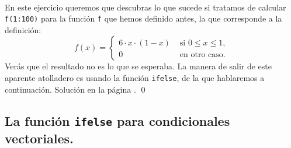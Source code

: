 \documentclass[10pt,a4paper]{article}\usepackage[]{graphicx}\usepackage[]{color}
\newcounter{cont01}
\begin{document}
\begin{ejercicio}
\label{tut05:ejercicio26}
\quad\\
En este ejercicio queremos que descubras lo que sucede si tratamos de calcular {\tt f(1:100)} para la función {\tt f} que hemos definido antes, la que corresponde a la definición:
\[
f(x)=
\begin{cases}
6\cdot x \cdot (1-x)&\mbox{ si }0\leq x\leq 1,\\
0&\mbox{ en otro caso.}
\end{cases}
\]
Verás que el resultado no es lo que se esperaba. La manera de salir de este aparente atolladero es usando la función {\tt ifelse}, de la que hablaremos a continuación.
Solución en la página \pageref{tut05:ejercicio26:sol}.
\qed
\end{ejercicio}

\subsection{La función {\tt ifelse} para condicionales vectoriales.}
\label{tut05:subsec:FuncionIfelse}
\end{document}
